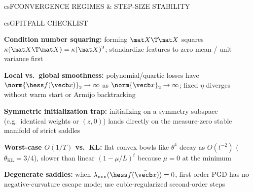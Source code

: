\documentclass[../../../../master.tex]{subfiles}
\begin{document}
\begin{cscolumns}
\begin{cscard}{csF}{CONVERGENCE REGIMES \& STEP-SIZE STABILITY}
  \centering
\end{cscard}
\columnbreak

\begin{cscard}{csG}{PITFALL CHECKLIST}
  \begin{csbul}
    \item \textbf{Condition number squaring:} forming $\mat X\T\mat X$ squares $\kappa(\mat X\T\mat X)=\kappa(\mat X)^2$; standardize features to zero mean / unit variance first
    \item \textbf{Local vs.\ global smoothness:} polynomial/quartic losses have $\norm{\hess f(\vecb x)}_2\to\infty$ as $\norm{\vecb x}_2\to\infty$; fixed $\eta$ diverges without warm start or Armijo backtracking
    \item \textbf{Symmetric initialization trap:} initializing on a symmetry subspace (e.g.\ identical weights or $(z,0)$) lands directly on the measure-zero stable manifold of strict saddles
    \item \textbf{Worst-case $O(1/T)$ vs.\ KL:} flat convex bowls like $\theta^4$ decay as $O(t^{-2})$ ($\theta_{\mathrm{KL}}=3/4$), slower than linear $(1-\mu/L)^t$ because $\mu=0$ at the minimum
    \item \textbf{Degenerate saddles:} when $\lambda_{\min}(\hess f(\bar{\vecb x}))=0$, first-order PGD has no negative-curvature escape mode; use cubic-regularized second-order steps
  \end{csbul}
\end{cscard}


\end{cscolumns}
\end{document}
